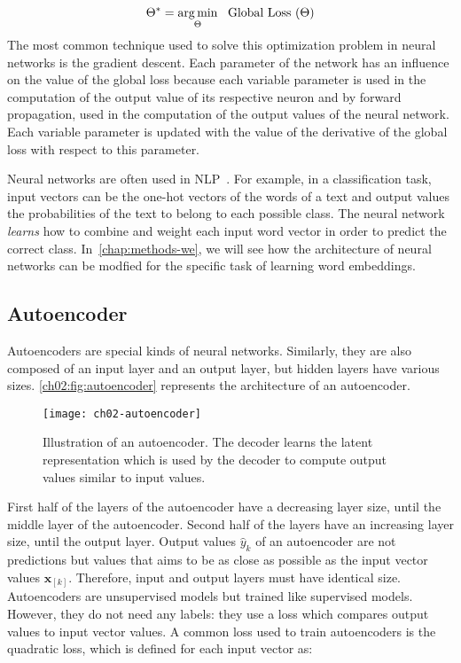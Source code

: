     \begin{equation}
      \Theta^* = \operatorname*{arg\,min}_{\Theta}~~\text{Global Loss  } (\Theta)
    \end{equation}
    The most common technique used to solve this optimization problem in neural
    networks is the gradient descent. Each parameter of the network has an
    influence on the value of the global loss because each variable parameter is
    used in the computation of the output value of its respective neuron and by
    forward propagation, used in the computation of the output values of the
    neural network. Each variable parameter is updated with the value of the
    derivative of the global loss with respect to this parameter. \medskip

    Neural networks are often used in NLP~\citep{zhang2015character,
    Xu2015convolutional, conneau2016very}. For example, in a classification
    task, input vectors can be the one-hot vectors of the words of a text and
    output values the probabilities of the text to belong to each possible
    class. The neural network \textit{learns} how to combine and weight each
    input word vector in order to predict the correct class.
    In~\autoref{chap:methods-we}, we will see how the architecture of neural
    networks can be modfied for the specific task of learning word embeddings.

  \subsection{Autoencoder}
    \label{ch02:subsec:autoencoder}
    Autoencoders are special kinds of neural networks. Similarly, they are also
    composed of an input layer and an output layer, but hidden layers have
    various sizes. \autoref{ch02:fig:autoencoder} represents the architecture of
    an autoencoder.

    \begin{figure}[t]
      \centering
      \texttt{[image: ch02-autoencoder]}
      \caption[Illustration of an autoencoder.] {Illustration of an autoencoder.
      The decoder learns the latent representation which is used by the decoder
      to compute output values similar to input values.}
      \label{ch02:fig:autoencoder}
    \end{figure}

    First half of the layers of the autoencoder have a decreasing layer size,
    until the middle layer of the autoencoder. Second half of the layers have an
    increasing layer size, until the output layer. Output values $\hat{y}_k$ of
    an autoencoder are not predictions but values that aims to be as close as
    possible as the input vector values $\mathbf{x}_{[k]}$. Therefore, input and
    output layers must have identical size. Autoencoders are unsupervised models
    but trained like supervised models. However, they do not need any labels:
    they use a loss which compares output values to input vector values. A
    common loss used to train autoencoders is the quadratic loss, which is
    defined for each input vector as:

